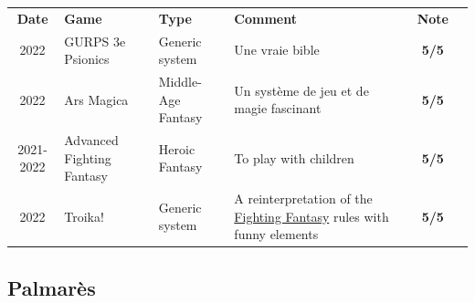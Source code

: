 \documentclass[a4paper, 11pt, twoside]{article}
\begin{document}
\begin{longtable}{cp{2cm}p{1.5cm}p{7cm}cc}
\textbf{Date} & \textbf{Game} & \textbf{Type} & \textbf{Comment} & \textbf{Note}\\
2022 & GURPS 3e Psionics & Generic system & Une vraie bible & \textbf{5/5}\\
2022 & Ars Magica & Middle-Age Fantasy & Un système de jeu et de magie fascinant & \textbf{5/5}\\
2021-2022 & Advanced Fighting Fantasy & Heroic Fantasy & To play with children & \textbf{5/5}\\
2022 & Troika! & Generic system & A reinterpretation of the \href{https://github.com/orey/jdr/tree/master/FightingFantasys-fr}{Fighting Fantasy} rules with funny elements & \textbf{5/5}\\
\end{longtable}

\subsection{Palmarès}
\label{sec:orga414a27}
\end{document}
